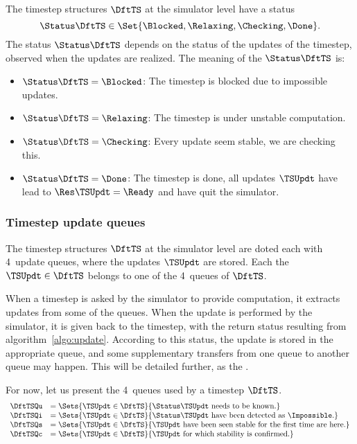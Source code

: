 The timestep structures $\DftTS$ at the simulator level have a status $$\Status\DftTS \in \Set{\Blocked, \Relaxing, \Checking, \Done}.$$ The status $\Status\DftTS$ depends on the status of the updates of the timestep, observed when the updates are realized. The meaning of the $\Status\DftTS$ is:
\begin{itemize}
\item $\Status\DftTS = \Blocked$: The timestep is blocked due to impossible updates.
\item $\Status\DftTS = \Relaxing$: The timestep is under unstable computation.
\item $\Status\DftTS = \Checking$: Every update seem stable, we are checking this.
\item $\Status\DftTS = \Done$: The timestep is done, all updates $\TSUpdt$ have lead to $\Res\TSUpdt = \Ready$ and have quit the simulator.
\end{itemize}

\subsubsection{Timestep update queues}

The timestep structures $\DftTS$ at the simulator level are doted each with 4~update queues, where the updates $\TSUpdt$ are stored. Each the $\TSUpdt \in \DftTS$ belongs to one of the 4~queues of $\DftTS$.

When a timestep is asked by the simulator to provide computation, it extracts updates from some of the queues. When the update is performed by the simulator, it is given back to the timestep, with the return status resulting from algorithm~\ref{algo:update}. According to this status, the update is stored in the appropriate queue, and some supplementary transfers from one queue to another queue may happen. This will be detailed further, as the .

For now, let us present the 4~queues used by a timestep $\DftTS$.
\begin{equation}
  \begin{array}{ll}
    \DftTSQu &= \Sets{\TSUpdt\in\DftTS}{\Status\TSUpdt \mbox{ needs to be known.}}                           \\
    \DftTSQi &= \Sets{\TSUpdt\in\DftTS}{\Status\TSUpdt \mbox{ have been detected as } \Impossible.}         \\
    \DftTSQs &= \Sets{\TSUpdt\in\DftTS}{\TSUpdt \mbox{ have been seen stable for the first time are here.}} \\
    \DftTSQc &= \Sets{\TSUpdt\in\DftTS}{\TSUpdt \mbox{ for which stability is confirmed.}}
  \end{array}
\end{equation}

